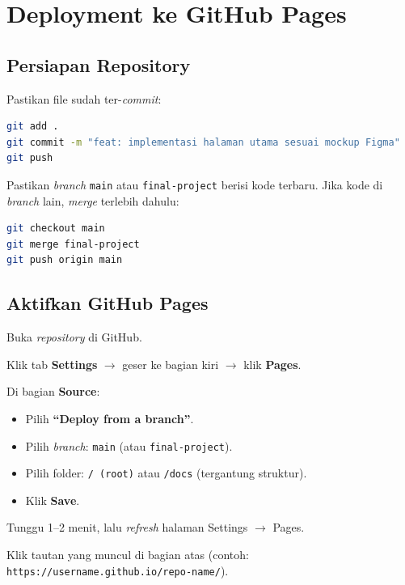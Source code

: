 \section{Deployment ke GitHub Pages}
\label{sec:deployment}

\subsection{Persiapan Repository}
\label{subsec:persiapan-deploy}

\begin{langkah}
  \item Pastikan file sudah ter-\emph{commit}:
\begin{lstlisting}[language=bash, caption={Commit implementasi}]
git add .
git commit -m "feat: implementasi halaman utama sesuai mockup Figma"
git push
\end{lstlisting}
  \item Pastikan \emph{branch} \texttt{main} atau \texttt{final-project} berisi kode terbaru. Jika kode di \emph{branch} lain, \emph{merge} terlebih dahulu:
\begin{lstlisting}[language=bash, caption={Merge ke main}]
git checkout main
git merge final-project
git push origin main
\end{lstlisting}
\end{langkah}

\subsection{Aktifkan GitHub Pages}
\label{subsec:aktifkan-gh-pages}

\begin{langkah}
  \item Buka \emph{repository} di GitHub.
  \item Klik tab \textbf{Settings} $\rightarrow$ geser ke bagian kiri $\rightarrow$ klik \textbf{Pages}.
  \item Di bagian \textbf{Source}:
  \begin{itemize}
    \item Pilih \textbf{``Deploy from a branch''}.
    \item Pilih \emph{branch}: \texttt{main} (atau \texttt{final-project}).
    \item Pilih folder: \texttt{/ (root)} atau \texttt{/docs} (tergantung struktur).
    \item Klik \textbf{Save}.
  \end{itemize}
  \item Tunggu 1--2 menit, lalu \emph{refresh} halaman Settings $\rightarrow$ Pages.
  \item Klik tautan yang muncul di bagian atas (contoh: \texttt{https://username.github.io/repo-name/}).
\end{langkah}

